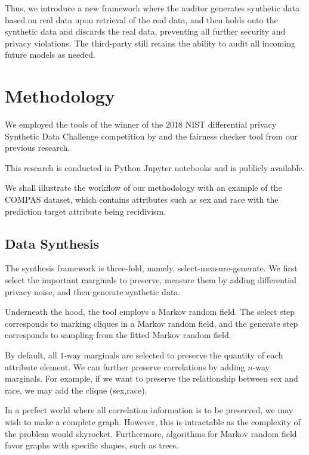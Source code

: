 \documentclass[manuscript,screen,review,anonymous]{acmart}
\begin{document}
Thus, we introduce a new framework where the auditor generates synthetic data based on real data upon retrieval of the real data, and then holds onto the synthetic data and discards the real data, preventing all further security and privacy violations. The third-party still retains the ability to audit all incoming future models as needed.

\section{Methodology}
\label{sec:method}

We employed the tools of the winner of the 2018 NIST differential privacy Synthetic Data Challenge competition\cite{NIST2018} by \cite{nist_ryan_2018,McKenna_private-PGM_2021,mckenna2021winning,mckenna2019graphical} and the fairness checker tool from our previous research\cite{yuan2024ensuring}.

This research is conducted in Python Jupyter notebooks and is publicly available.

We shall illustrate the workflow of our methodology with an example of the COMPAS dataset, which contains attributes such as sex and race with the prediction target attribute being recidivism.

\subsection{Data Synthesis}

The synthesis framework is three-fold, namely, select-measure-generate\cite{McKenna2022,YouTube_Differentially_Private_Synthetic_Data}. We first select the important marginals to preserve, measure them by adding differential privacy noise, and then generate synthetic data.

Underneath the hood, the tool employs a Markov random field. The select step corresponds to marking cliques in a Markov random field, and the generate step corresponds to sampling from the fitted Markov random field.

By default, all $1$-way marginals are selected to preserve the quantity of each attribute element. We can further preserve correlations by adding $n$-way marginals. For example, if we want to preserve the relationship between sex and race, we may add the clique (sex,race).

In a perfect world where all correlation information is to be preserved, we may wish to make a complete graph. However, this is intractable as the complexity of the problem would skyrocket. Furthermore, algorithms for Markov random field favor graphs with specific shapes, such as trees.
\end{document}
